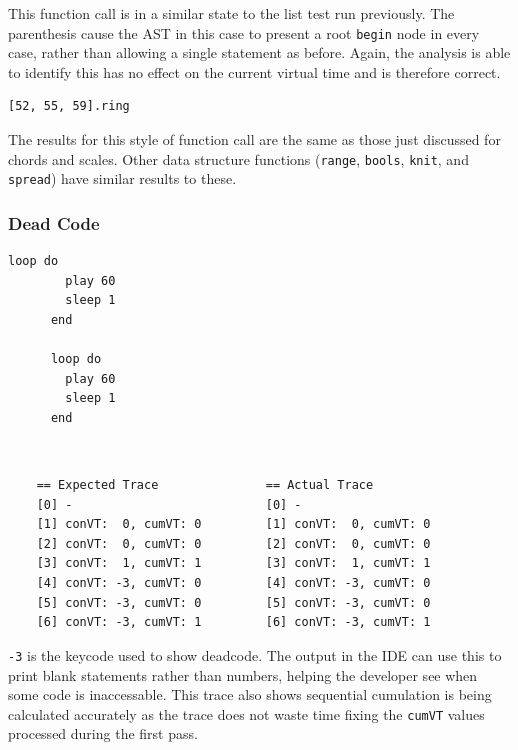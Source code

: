 \documentclass[11pt, abstracton, twoside, titlepage=true]{scrartcl}
\begin{document}
This function call is in a similar state to the list test run previously. The 
parenthesis cause the AST in this case to present a root \texttt{begin} node in 
every case, rather than allowing a single statement as before. Again, the analysis 
is able to identify this has no effect on the current virtual time and is therefore 
correct. 

\begin{minipage}{\textwidth}
	\begin{lstlisting}[style = sonicpi]
      [52, 55, 59].ring
	\end{lstlisting}
\end{minipage}

The results for this style of function call are the same as those just discussed 
for chords and scales. Other data structure functions (\texttt{range}, 
\texttt{bools}, \texttt{knit}, and \texttt{spread}) have similar results to 
these.

\subsubsection{Dead Code}
\begin{minipage}{\textwidth}
	\begin{lstlisting}[style = sonicpi]
      loop do
        play 60
        sleep 1
      end

      loop do
        play 60
        sleep 1
      end
	\end{lstlisting}
\end{minipage}
\\
\begin{lstlisting}
    == Expected Trace               == Actual Trace
    [0] -                           [0] -
    [1] conVT:  0, cumVT: 0         [1] conVT:  0, cumVT: 0
    [2] conVT:  0, cumVT: 0         [2] conVT:  0, cumVT: 0
    [3] conVT:  1, cumVT: 1         [3] conVT:  1, cumVT: 1
    [4] conVT: -3, cumVT: 0         [4] conVT: -3, cumVT: 0
    [5] conVT: -3, cumVT: 0         [5] conVT: -3, cumVT: 0
    [6] conVT: -3, cumVT: 1         [6] conVT: -3, cumVT: 1
\end{lstlisting}

\texttt{-3} is the keycode used to show deadcode. The output in the IDE can use 
this to print blank statements rather than numbers, helping the developer see
when some code is inaccessable. This trace also shows sequential cumulation is 
being calculated accurately as the trace does not waste time fixing the 
\texttt{cumVT} values processed during the first pass.
\end{document}
